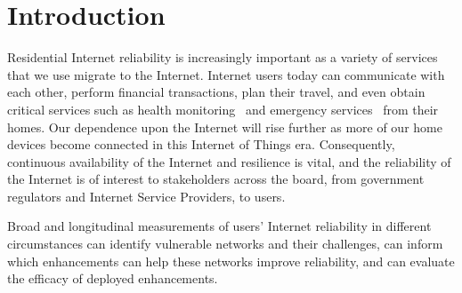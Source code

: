 

\section{Introduction}






Residential Internet reliability is increasingly important as a variety of
services that we use migrate to the Internet. Internet users today can
communicate with each other, perform financial transactions, plan
their travel, and even obtain critical services such as health
monitoring~\cite{ideal-life, remote-health-elderly} and emergency
services~\cite{emergency-voip-voipfone, emergency-voip-fcc} from their
homes. Our dependence upon the Internet will rise further as more of
our home devices become connected in this Internet of Things
era. Consequently, continuous availability of the Internet and
resilience is vital, and the reliability of the Internet is of
interest to stakeholders across the board, from government regulators and
Internet Service Providers, to users.



Broad and longitudinal
measurements of users' Internet reliability in different circumstances
can identify vulnerable networks and their challenges, can inform
which enhancements can help these networks improve reliability, and
can evaluate the efficacy of deployed enhancements.

